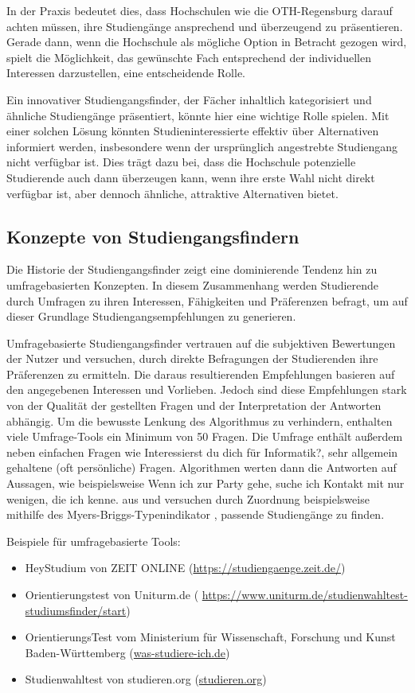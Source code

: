 In der Praxis bedeutet dies, dass Hochschulen wie die OTH-Regensburg darauf
achten müssen, ihre Studiengänge ansprechend und überzeugend zu präsentieren.
Gerade dann, wenn die Hochschule als mögliche Option in Betracht gezogen wird,
spielt die Möglichkeit, das gewünschte Fach entsprechend der individuellen
Interessen darzustellen, eine entscheidende Rolle.

Ein innovativer Studiengangsfinder, der Fächer inhaltlich kategorisiert und
ähnliche Studiengänge präsentiert, könnte hier eine wichtige Rolle spielen. Mit
einer solchen Lösung könnten Studieninteressierte effektiv über Alternativen
informiert werden, insbesondere wenn der ursprünglich angestrebte Studiengang
nicht verfügbar ist. Dies trägt dazu bei, dass die Hochschule potenzielle
Studierende auch dann überzeugen kann, wenn ihre erste Wahl nicht direkt
verfügbar ist, aber dennoch ähnliche, attraktive Alternativen bietet.


\subsection{Konzepte von Studiengangsfindern}\label{sec:konzepte-von-studiengangsfindern}
Die Historie der Studiengangsfinder zeigt eine dominierende Tendenz hin zu
umfragebasierten Konzepten. In diesem Zusammenhang werden Studierende durch
Umfragen zu ihren Interessen, Fähigkeiten und Präferenzen befragt, um auf dieser
Grundlage Studiengangsempfehlungen zu generieren.

Umfragebasierte Studiengangsfinder vertrauen auf die subjektiven Bewertungen
der Nutzer und versuchen, durch direkte Befragungen der Studierenden ihre
Präferenzen zu ermitteln. Die daraus resultierenden Empfehlungen basieren auf
den angegebenen Interessen und Vorlieben. Jedoch sind diese Empfehlungen stark
von der Qualität der gestellten Fragen und der Interpretation der Antworten
abhängig. Um die bewusste Lenkung des Algorithmus zu verhindern, enthalten viele
Umfrage-Tools ein Minimum von 50 Fragen. Die Umfrage enthält außerdem neben
einfachen Fragen wie \glqq Interessierst du dich für Informatik?\grqq{}, sehr
allgemein gehaltene (oft persönliche) Fragen. Algorithmen werten dann die
Antworten auf Aussagen, wie beispielsweise \glqq Wenn ich zur Party
gehe, suche ich Kontakt mit nur wenigen, die ich kenne.\grqq{} aus und versuchen
durch Zuordnung beispielsweise mithilfe des Myers-Briggs-Typenindikator
\parencite{myers-briggs}, passende Studiengänge zu finden. \parencite{uniturm}

Beispiele für umfragebasierte Tools:
\begin{itemize}
    \item HeyStudium von ZEIT ONLINE (\url{https://studiengaenge.zeit.de/})
    \item Orientierungstest von Uniturm.de (
        \url{https://www.uniturm.de/studienwahltest-studiumsfinder/start})
    \item OrientierungsTest vom Ministerium für Wissenschaft, Forschung und
        Kunst Baden-Württemberg (\url{was-studiere-ich.de})
    \item Studienwahltest von studieren.org (\url{studieren.org})
\end{itemize}

